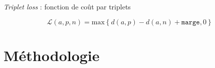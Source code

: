 \documentclass[11pt,aspectratio=169]{beamer}
\begin{document}
\begin{frame}{\textsl{Triplet loss} : fonction de coût par triplets}

\begin{equation*}
    \mathcal{L}(a, p, n) = \text{max}\left\{ d(a, p) - d(a, n) + \texttt{marge}, 0\right\}
\end{equation*}

\end{frame}

\section{Méthodologie}
\end{document}
